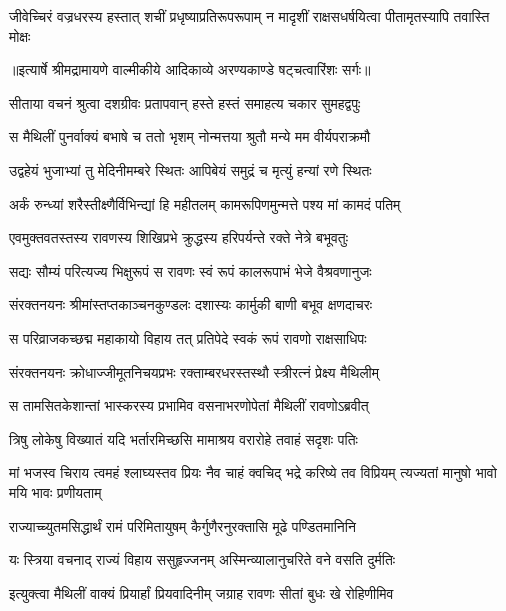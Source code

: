 \fourlineindentedshloka
{जीवेच्चिरं वज्रधरस्य हस्तात्}
{शचीं प्रधृष्याप्रतिरूपरूपाम्}
{न मादृशीं राक्षसधर्षयित्वा}
{पीतामृतस्यापि तवास्ति मोक्षः} %


{॥इत्यार्षे श्रीमद्रामायणे वाल्मीकीये आदिकाव्ये अरण्यकाण्डे षट्चत्वारिंशः सर्गः॥}


\twolineshloka
{सीताया वचनं श्रुत्वा दशग्रीवः प्रतापवान्}
{हस्ते हस्तं समाहत्य चकार सुमहद्वपुः} %

\twolineshloka
{स मैथिलीं पुनर्वाक्यं बभाषे च ततो भृशम्}
{नोन्मत्तया श्रुतौ मन्ये मम वीर्यपराक्रमौ} %

\twolineshloka
{उद्वहेयं भुजाभ्यां तु मेदिनीमम्बरे स्थितः}
{आपिबेयं समुद्रं च मृत्युं हन्यां रणे स्थितः} %

\twolineshloka
{अर्कं रुन्ध्यां शरैस्तीक्ष्णैर्विभिन्द्यां हि महीतलम्}
{कामरूपिणमुन्मत्ते पश्य मां कामदं पतिम्} %

\twolineshloka
{एवमुक्तवतस्तस्य रावणस्य शिखिप्रभे}
{क्रुद्धस्य हरिपर्यन्ते रक्ते नेत्रे बभूवतुः} %

\twolineshloka
{सद्यः सौम्यं परित्यज्य भिक्षुरूपं स रावणः}
{स्वं रूपं कालरूपाभं भेजे वैश्रवणानुजः} %

\twolineshloka
{संरक्तनयनः श्रीमांस्तप्तकाञ्चनकुण्डलः}
{दशास्यः कार्मुकी बाणी बभूव क्षणदाचरः} %

\twolineshloka
{स परिव्राजकच्छद्म महाकायो विहाय तत्}
{प्रतिपेदे स्वकं रूपं रावणो राक्षसाधिपः} %

\twolineshloka
{संरक्तनयनः क्रोधाज्जीमूतनिचयप्रभः}
{रक्ताम्बरधरस्तस्थौ स्त्रीरत्नं प्रेक्ष्य मैथिलीम्} %

\twolineshloka
{स तामसितकेशान्तां भास्करस्य प्रभामिव}
{वसनाभरणोपेतां मैथिलीं रावणोऽब्रवीत्} %

\twolineshloka
{त्रिषु लोकेषु विख्यातं यदि भर्तारमिच्छसि}
{मामाश्रय वरारोहे तवाहं सदृशः पतिः} %

\threelineshloka
{मां भजस्व चिराय त्वमहं श्लाघ्यस्तव प्रियः}
{नैव चाहं क्वचिद् भद्रे करिष्ये तव विप्रियम्}
{त्यज्यतां मानुषो भावो मयि भावः प्रणीयताम्} %

\twolineshloka
{राज्याच्च्युतमसिद्धार्थं रामं परिमितायुषम्}
{कैर्गुणैरनुरक्तासि मूढे पण्डितमानिनि} %

\twolineshloka
{यः स्त्रिया वचनाद् राज्यं विहाय ससुहृज्जनम्}
{अस्मिन्व्यालानुचरिते वने वसति दुर्मतिः} %

\twolineshloka
{इत्युक्त्वा मैथिलीं वाक्यं प्रियार्हां प्रियवादिनीम्}
{जग्राह रावणः सीतां बुधः खे रोहिणीमिव} %

